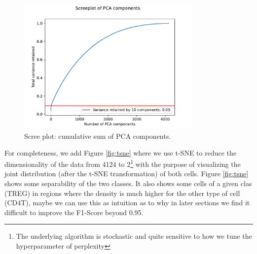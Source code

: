 \documentclass{article}
\begin{document}
\begin{figure}[h]
    \centering
    \includegraphics[width=0.8\textwidth]{t11_screeplot.pdf}
    \caption{Scree plot: cumulative sum of PCA components.}\label{fig:scree}
\end{figure}

For completeness, we add Figure \ref{fig:tsne} where we use t-SNE to reduce the dimensionality of the data from 4124 to 2\footnote{ The underlying algorithm is stochastic 
and quite sensitive to how we tune the hyperparameter of perplexity} with the purpose of visualizing the joint distribution (after the t-SNE transformation) of both cells. 
Figure \ref{fig:tsne} shows some separability of the two classes. It also shows some cells of a given clas (TREG) in regions where the density is much higher for the other type of cell (CD4T), maybe we can use this as intuition as to why
in later sections we find it difficult to improve the F1-Score beyond 0.95.
\end{document}
